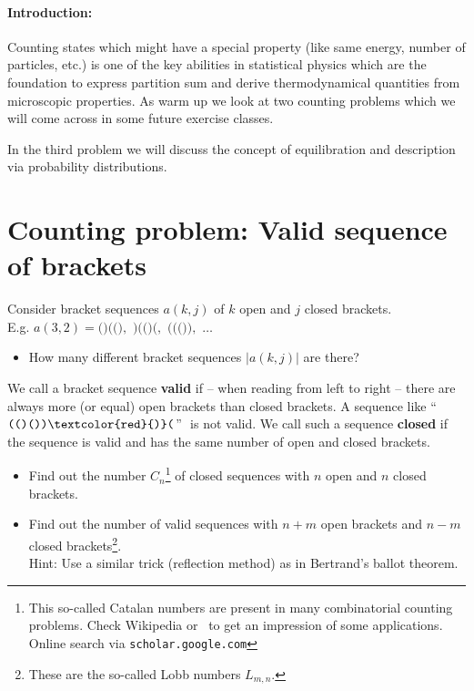 \documentclass[12pt,a4paper]{article} %
\begin{document}
 
 
 \vspace{1cm}
 \paragraph{Introduction:} Counting states which might have a special property (like same energy, number of particles, etc.) is one of the key abilities in statistical physics which are the foundation to express partition sum and derive thermodynamical quantities from microscopic properties. 
 As warm up we look at two counting problems which we will come across in some future exercise classes.
 
 In the third problem we will discuss the concept of equilibration and description via probability distributions.
 
 
 \section{Counting problem: Valid sequence of brackets}
 Consider bracket sequences $a(k,j)$ of $k$ open and $j$ closed brackets.\\
 E.g. $a(3,2)= \texttt{()(()}, \,\,\texttt{)(()(},\,\, \texttt{((())}, \,\, \dots $
 \begin{itemize}
  \item How many different bracket sequences $\left| a(k,j)\right|$ are there?
 \end{itemize}
 We call a bracket sequence \textbf{valid} if -- when reading from left to right -- there are always more (or equal) open brackets than closed brackets. A sequence like ``$\texttt{(()())\textcolor{red}{)}(}$'' $ $ is not valid. We call such a sequence \textbf{closed} if the sequence is valid and has the same number of open and closed brackets.
 \begin{itemize}
  \item Find out the number $C_n$\footnote{This so-called Catalan numbers are present in many combinatorial counting problems. Check Wikipedia or~\cite{mccammond2006noncrossing} to get an impression of some applications. Online search via {\tt scholar.google.com}} of closed sequences with $n$ open and $n$ closed brackets.
 \end{itemize}
 \begin{itemize}
  \item Find out the number of valid sequences with $n+m$ open brackets and $n-m$ closed brackets\footnote{These are the so-called Lobb numbers $L_{m,n}$.}.\\
  Hint: Use a  similar trick (reflection method) as in Bertrand's ballot theorem.
 \end{itemize}
\end{document}
